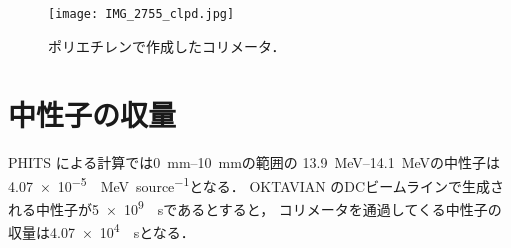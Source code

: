 \documentclass[../master]{subfiles}
\begin{document}
\begin{figure}
  \centering
  \texttt{[image: IMG\_2755\_clpd.jpg]}
  \caption[ポリエチレンで作成したコリメータ．]
          {ポリエチレンで作成したコリメータ．}
  \label{pic::collimator}
\end{figure}

\section{中性子の収量}
PHITS による計算では\SIrange{0}{10}{\milli\metre}の範囲の
\SIrange{13.9}{14.1}{\mega\electronvolt}の中性子は
\SI{4.07e-5}{\per\mega\electronvolt\per source}となる．
OKTAVIAN のDCビームラインで生成される中性子が\SI{5e9}{\per\second}であるとすると，
コリメータを通過してくる中性子の収量は\SI{4.07e4}{\per\second}となる．
\end{document}
